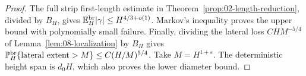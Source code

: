 \begin{proof}
The full strip first-length estimate in
Theorem~\ref{prop:02-length-reduction}, divided by \(B_H\), gives
\(\mathbb E_H^{\mathrm{br}}|\gamma|\le H^{4/3+o(1)}\). Markov's inequality proves the
upper bound with polynomially small failure. Finally, dividing the lateral
loss \(CHM^{-5/4}\) of Lemma~\ref{lem:08-localization} by \(B_H\) gives
\(\mathbb P_H^{\mathrm{br}}\{\text{lateral extent}>M\}\le C(H/M)^{5/4}\).
Take \(M=H^{1+\varepsilon}\). The deterministic height span is \(d_0H\),
which also proves the lower diameter bound.
\end{proof}

